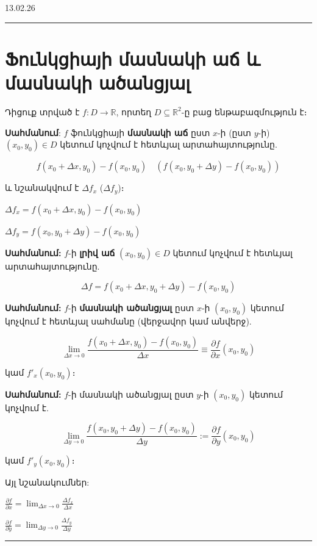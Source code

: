 \documentclass[12pt, a4paper]{article}
\begin{document}
13.02.26

\tableofcontents
\vspace{2em}
\hrule
\vspace{2em}

\section{Ֆունկցիայի մասնակի աճ և մասնակի ածանցյալ}

Դիցուք տրված է $f: D \to \mathbb{R}$, որտեղ $D \subseteq \mathbb{R}^2$-ը բաց ենթաբազմություն է։

\textbf{Սահմանում}: $f$ ֆունկցիայի \textbf{մասնակի աճ} ըստ $x$-ի (ըստ $y$-ի) $(x_0, y_0) \in D$ կետում կոչվում է հետևյալ արտահայտությունը.

$$f(x_0 + \Delta x, y_0) - f(x_0, y_0) \quad \left( f(x_0, y_0 + \Delta y) - f(x_0, y_0) \right)$$

և նշանակվում է $\Delta f_x$ ($\Delta f_y$)։

$\Delta f_x = f(x_0 + \Delta x, y_0) - f(x_0, y_0)$

$\Delta f_y = f(x_0, y_0 + \Delta y) - f(x_0, y_0)$

\textbf{Սահմանում:} $f$-ի \textbf{լրիվ աճ} $(x_0, y_0) \in D$ կետում կոչվում է հետևյալ արտահայտությունը.

$$\Delta f = f(x_0 + \Delta x, y_0 + \Delta y) - f(x_0, y_0)$$

\textbf{Սահմանում:} $f$-ի \textbf{մասնակի ածանցյալ} ըստ $x$-ի $(x_0, y_0)$ կետում կոչվում է հետևյալ սահմանը (վերջավոր կամ անվերջ).

$$\lim_{\Delta x \to 0} \frac{f(x_0 + \Delta x, y_0) - f(x_0, y_0)}{\Delta x} \equiv \frac{\partial f}{\partial x}(x_0, y_0)$$

կամ $f'_x(x_0, y_0)$։

\textbf{Սահմանում:} $f$-ի մասնակի ածանցյալ ըստ $y$-ի $(x_0, y_0)$ կետում կոչվում է.

$$\lim_{\Delta y \to 0} \frac{f(x_0, y_0 + \Delta y) - f(x_0, y_0)}{\Delta y} := \frac{\partial f}{\partial y}(x_0, y_0)$$

կամ $f'_y(x_0, y_0)$։

Այլ նշանակումներ:

$\frac{\partial f}{\partial x} = \lim_{\Delta x \to 0} \frac{\Delta f_x}{\Delta x}$

$\frac{\partial f}{\partial y} = \lim_{\Delta y \to 0} \frac{\Delta f_y}{\Delta y}$

\vspace{1em}
\hrule
\vspace{1em}
\end{document}
